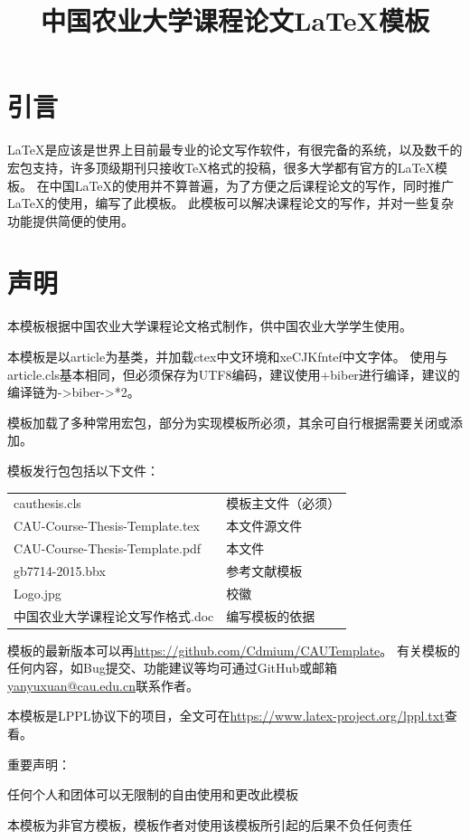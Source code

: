 \documentclass[twoside,maketable]{cauthesis}
\title{中国农业大学课程论文\LaTeX{}模板}%
\date{}%
\author{}%
\begin{document}
    \section{引言}
    \LaTeX{}是应该是世界上目前最专业的论文写作软件，有很完备的系统，以及数千的宏包支持，许多顶级期刊只接收\TeX{}格式的投稿，很多大学都有官方的\LaTeX{}模板。
    在中国\LaTeX{}的使用并不算普遍，为了方便之后课程论文的写作，同时推广\LaTeX{}的使用，编写了此模板。
    此模板可以解决课程论文的写作，并对一些复杂功能提供简便的使用。
    \section{声明}
    本模板根据中国农业大学课程论文格式制作，供中国农业大学学生使用。

    本模板是以article为基类，并加载ctex中文环境和xeCJKfntef中文字体。
    使用与article.cls基本相同，但必须保存为UTF8编码，建议使用\XeLaTeX{}+biber进行编译，建议的编译链为\XeLaTeX{}->biber->\XeLaTeX{}*2。

    模板加载了多种常用宏包，部分为实现模板所必须，其余可自行根据需要关闭或添加。

    模板发行包包括以下文件：

    \begin{table}[H]
        \begin{tabular}{ll}
            cauthesis.cls&模板主文件（必须）\\
            CAU-Course-Thesis-Template.tex&本文件源文件\\
            CAU-Course-Thesis-Template.pdf&本文件\\
            gb7714-2015.bbx&参考文献模板\\
            Logo.jpg&校徽\\
            中国农业大学课程论文写作格式.doc&编写模板的依据
        \end{tabular}
    \end{table}
    
    模板的最新版本可以再\url{https://github.com/Cdmium/CAUTemplate}。
    有关模板的任何内容，如Bug提交、功能建议等均可通过GitHub或邮箱\url{yanyuxuan@cau.edu.cn}联系作者。

    本模板是LPPL协议下的项目，全文可在\url{https://www.latex-project.org/lppl.txt}查看。

    重要声明：
    \begin{level}{1}
        \item 任何个人和团体可以无限制的自由使用和更改此模板
        \item 本模板为非官方模板，模板作者对使用该模板所引起的后果不负任何责任
    \end{level}
\end{document}
